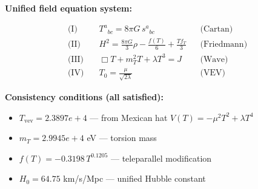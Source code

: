 
\textbf{Unified field equation system:}

\begin{align}
  \text{(I)} \quad & T^a{}_{bc} = 8\pi G \, s^a{}_{bc} && \text{(Cartan)} \\
  \text{(II)} \quad & H^2 = \frac{8\pi G}{3}\rho - \frac{f(T)}{6} + \frac{Tf_T}{3} && \text{(Friedmann)} \\
  \text{(III)} \quad & \Box T + m_T^2 T + \lambda T^3 = J && \text{(Wave)} \\
  \text{(IV)} \quad & T_0 = \frac{\mu}{\sqrt{2\lambda}} && \text{(VEV)}
\end{align}

\textbf{Consistency conditions (all satisfied):}
\begin{itemize}
  \item $T_{\text{vev}} = 2.3897e+4$ — from Mexican hat $V(T) = -\mu^2 T^2 + \lambda T^4$
  \item $m_T = 2.9945e+4$ eV — torsion mass
  \item $f(T) = -0.3198 \, T^{0.1205}$ — teleparallel modification
  \item $H_0 = 64.75$ km/s/Mpc — unified Hubble constant
\end{itemize}